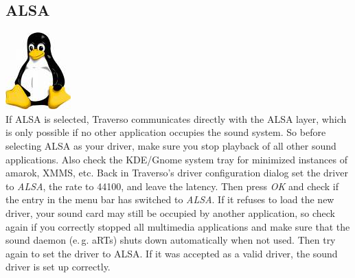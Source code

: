 \subsection{ALSA}
\includegraphics[height=\baselineskip]{images/tux.png}
\\
If ALSA is selected, Traverso communicates directly with the ALSA layer, which is only possible if no other application occupies the sound system. So before selecting ALSA as your driver, make sure you stop playback of all other sound applications. Also check the KDE/Gnome system tray for minimized instances of amarok, XMMS, etc. Back in Traverso's driver configuration dialog set the driver to \emph{ALSA}, the rate to 44100, and leave the latency. Then press \emph{OK} and check if the entry in the menu bar has switched to \emph{ALSA}. If it refuses to load the new driver, your sound card may still be occupied by another application, so check again if you correctly stopped all multimedia applications and make sure that the sound daemon (e.\,g. aRTs) shuts down automatically when not used. Then try again to set the driver to ALSA. If it was accepted as a valid driver, the sound driver is set up correctly.

